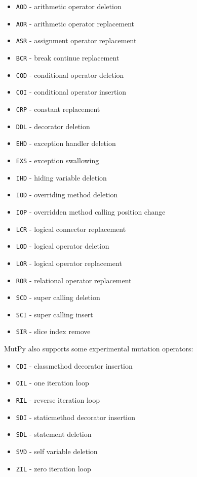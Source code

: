 \documentclass[12pt]{article}
\begin{document}
\begin{itemize}
  \itemsep0em 
  \item \texttt{AOD} - arithmetic operator deletion
  \item \texttt{AOR} - arithmetic operator replacement
  \item \texttt{ASR} - assignment operator replacement
  \item \texttt{BCR} - break continue replacement
  \item \texttt{COD} - conditional operator deletion
  \item \texttt{COI} - conditional operator insertion
  \item \texttt{CRP} - constant replacement
  \item \texttt{DDL} - decorator deletion
  \item \texttt{EHD} - exception handler deletion
  \item \texttt{EXS} - exception swallowing
  \item \texttt{IHD} - hiding variable deletion
  \item \texttt{IOD} - overriding method deletion
  \item \texttt{IOP} - overridden method calling position change
  \item \texttt{LCR} - logical connector replacement
  \item \texttt{LOD} - logical operator deletion
  \item \texttt{LOR} - logical operator replacement
  \item \texttt{ROR} - relational operator replacement
  \item \texttt{SCD} - super calling deletion
  \item \texttt{SCI} - super calling insert
  \item \texttt{SIR} - slice index remove
\end{itemize}

MutPy also supports some experimental mutation operators:

\begin{itemize}
  \itemsep0em 
  \item \texttt{CDI} - classmethod decorator insertion
  \item \texttt{OIL} - one iteration loop
  \item \texttt{RIL} - reverse iteration loop
  \item \texttt{SDI} - staticmethod decorator insertion
  \item \texttt{SDL} - statement deletion
  \item \texttt{SVD} - self variable deletion
  \item \texttt{ZIL} - zero iteration loop
\end{itemize}
\end{document}
